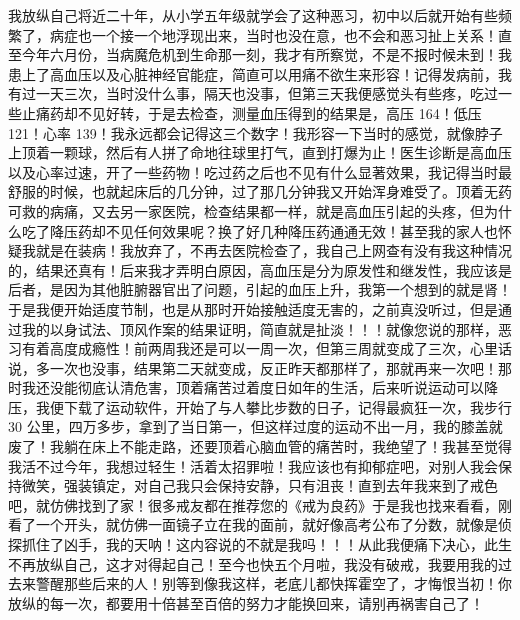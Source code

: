 \begin{case}\label{126.2}
    我放纵自己将近二十年，从小学五年级就学会了这种恶习，初中以后就开始有些频繁了，病症也一个接一个地浮现出来，当时也没在意，也不会和恶习扯上关系！直至今年六月份，当病魔危机到生命那一刻，我才有所察觉，不是不报时候未到！我患上了高血压以及心脏神经官能症，简直可以用痛不欲生来形容！记得发病前，我有过一天三次，当时没什么事，隔天也没事，但第三天我便感觉头有些疼，吃过一些止痛药却不见好转，于是去检查，测量血压得到的结果是，高压 164！低压 121！心率 139！我永远都会记得这三个数字！我形容一下当时的感觉，就像脖子上顶着一颗球，然后有人拼了命地往球里打气，直到打爆为止！医生诊断是高血压以及心率过速，开了一些药物！吃过药之后也不见有什么显著效果，我记得当时最舒服的时候，也就起床后的几分钟，过了那几分钟我又开始浑身难受了。顶着无药可救的病痛，又去另一家医院，检查结果都一样，就是高血压引起的头疼，但为什么吃了降压药却不见任何效果呢？换了好几种降压药通通无效！甚至我的家人也怀疑我就是在装病！我放弃了，不再去医院检查了，我自己上网查有没有我这种情况的，结果还真有！后来我才弄明白原因，高血压是分为原发性和继发性，我应该是后者，是因为其他脏腑器官出了问题，引起的血压上升，我第一个想到的就是肾！于是我便开始适度节制，也是从那时开始接触适度无害的，之前真没听过，但是通过我的以身试法、顶风作案的结果证明，简直就是扯淡！！！就像您说的那样，恶习有着高度成瘾性！前两周我还是可以一周一次，但第三周就变成了三次，心里话说，多一次也没事，结果第二天就变成，反正昨天都那样了，那就再来一次吧！那时我还没能彻底认清危害，顶着痛苦过着度日如年的生活，后来听说运动可以降压，我便下载了运动软件，开始了与人攀比步数的日子，记得最疯狂一次，我步行 30 公里，四万多步，拿到了当日第一，但这样过度的运动不出一月，我的膝盖就废了！我躺在床上不能走路，还要顶着心脑血管的痛苦时，我绝望了！我甚至觉得我活不过今年，我想过轻生！活着太招罪啦！我应该也有抑郁症吧，对别人我会保持微笑，强装镇定，对自己我只会保持安静，只有沮丧！直到去年我来到了戒色吧，就仿佛找到了家！很多戒友都在推荐您的《戒为良药》于是我也找来看看，刚看了一个开头，就仿佛一面镜子立在我的面前，就好像高考公布了分数，就像是侦探抓住了凶手，我的天呐！这内容说的不就是我吗！！！从此我便痛下决心，此生不再放纵自己，这才对得起自己！至今也快五个月啦，我没有破戒，我要用我的过去来警醒那些后来的人！别等到像我这样，老底儿都快挥霍空了，才悔恨当初！你放纵的每一次，都要用十倍甚至百倍的努力才能换回来，请别再祸害自己了！


\end{case}
